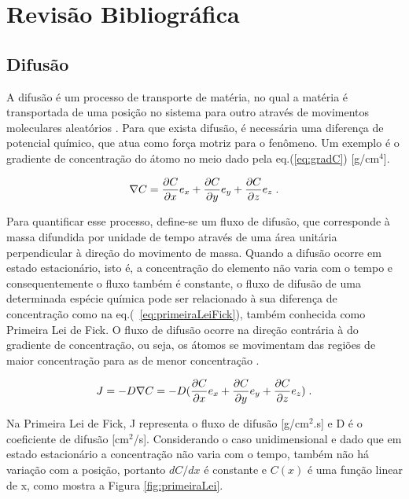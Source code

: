 \documentclass[]{politex}
\begin{document}
\chapter{Revisão Bibliográfica}
\section{Difusão}
\label{sec:difusao}
	A difusão é um processo de transporte de matéria, no qual a matéria é transportada de uma posição no sistema para outro através de movimentos moleculares aleatórios \cite{crank1979mathematics}. Para que exista difusão, é necessária uma diferença de potencial químico, que atua como força motriz para o fenômeno. Um exemplo é o gradiente de concentração do átomo no meio dado pela eq.(\ref{eq:gradC}) [g/cm$^4$]. 

\begin{equation} \label{eq:gradC}
\nabla C = \pdv{C}{x}e_x + \pdv{C}{y}e_y + \pdv{C}{z}e_z \; .
\end{equation}

Para quantificar esse processo, define-se um fluxo de difusão, que corresponde à massa difundida por unidade de tempo através de uma área unitária perpendicular à direção do movimento de massa. Quando a difusão ocorre em estado estacionário, isto é, a concentração do elemento não varia com o tempo e consequentemente o fluxo também é constante, o fluxo de difusão de uma determinada espécie química pode ser relacionado à sua diferença de concentração como na eq.(~\ref{eq:primeiraLeiFick}), também conhecida como Primeira Lei de Fick. O fluxo de difusão ocorre na direção contrária à do gradiente de concentração, ou seja, os átomos se movimentam das regiões de maior concentração para as de menor concentração \cite{crank1979mathematics}.

\begin{equation} \label{eq:primeiraLeiFick}
J = -D\nabla C = -D(\pdv{C}{x}e_x + \pdv{C}{y}e_y + \pdv{C}{z}e_z) \; .
\end{equation}

	Na Primeira Lei de Fick, J representa o fluxo de difusão [g/cm$^2$.s] e D é o coeficiente de difusão [cm$^2$/s]. Considerando o caso unidimensional e dado que em estado estacionário a concentração não varia com o tempo, também não há variação com a posição, portanto $dC/dx$ é constante e $C(x)$ é uma função linear de x, como mostra a Figura \ref{fig:primeiraLei}. \par
	
\end{document}
